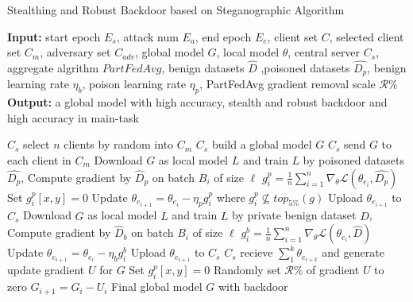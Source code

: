 \documentclass{article}
\begin{document}
\begin{algorithm}[t]
	\caption{Stealthing and Robust Backdoor based on Steganographic Algorithm} %
	\hspace*{0.02in} {\bf Input:} %
	{start epoch $E_s$, attack num $E_a$, end epoch $E_e$, client set $C$, selected client set $C_m$, adversary set $C_{adv}$, global model $G$, local model $\theta$, central server $C_s$, aggregate algrithm $PartFedAvg$, benign datasets $\hat{D}$ ,poisoned datasets $\hat{D_p}$, benign learning rate $\eta_b$, poison learning rate $\eta_p$, PartFedAvg gradient removal scale $ \mathcal{R\%} $}\\
	\hspace*{0.02in} {\bf Output:} %
	a global model with high accuracy, stealth and robust backdoor and high accuracy in main-task


	\begin{algorithmic}[1]

	\State $C_s$ select $n$ clients by random into $C_m$ %
	\State $C_s$ build a global model $G$
	\State $C_s$ send $G$ to each client in $C_m$
				\State Download $G$ as local model $L$ and train $L$ by poisoned datasets $\hat{D_p}$, 
				\State Compute gradient by $\hat{D}_p$ on batch $B_i$ of size $\ell$
				\State $ g_i^p = \frac{1}{n}\sum_{i = 1}^{n}\nabla_\theta \mathcal{L}(\theta_{e_i}, \hat{D_p}) $
						\State Set $g_i^p[x,y] = 0$
					\EndIf
				\EndFor
				\State Update $ \theta_{e_{i+1}} = \theta_{e_i} - \eta_p g_i^p $ where $ g_i^p \not\subseteq top_{5\%}(g) $
				\State Upload $ \theta_{e_{i+1}}$ to $C_s $
				\State Download $G$ as local model $L$ and train $L$ by private benign dataset $\hat{D}$, 
				\State Compute gradient by $\hat{D}_b$ on batch $B_i$ of size $\ell$
				\State $ g_i^b = \frac{1}{n}\sum_{i = 1}^{n}\nabla_\theta \mathcal{L}(\theta_{e_i}, \hat{D}) $
				\State Update $ \theta_{e_{i+1}} = \theta_{e_i} - \eta_b g_i^b $
				\State Upload $ \theta_{e_{i+1}}$ to $C_s $
			\EndIf
			\State $C_s$ recieve $ \sum_1^k \theta_{e_{i+k}}$ and generate update gradient $U$ for $G$
				\State Set $g_i^p[x,y] = 0$
			\EndFor
		\EndFor
	\State Randomly set $ \mathcal{R\%} $ of gradient $U$ to zero
	\State $G_{i+1} = G_i - U_i$
	\EndFor
\State \Return Final global model $G$ with backdoor

	\end{algorithmic}
	

\end{algorithm}
\end{document}

